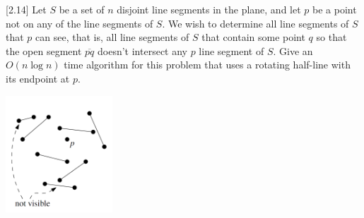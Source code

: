 \documentclass[11pt]{article}
\newenvironment{Quest}{ \begin{framed}} {\end{framed}  \vspace{0.2 cm}}
\begin{document}
\begin{Quest}

[2.14] Let $S$ be a set of $n$ disjoint line segments in the plane, and let $p$ be a point not on any of the line segments of $S$. We wish to determine all line segments of $S$ that $p$ can see, that is, all line segments of $S$ that contain some point $q$ so that the open segment $\overline{pq}$ doesn’t intersect any
$p$ line segment of $S$. Give an $O(n\log n)$ time algorithm for this problem that uses a rotating half-line with its endpoint at $p$.

\includegraphics[width=0.3\textwidth]{exercise3}

\end{Quest}
    
\end{document}
